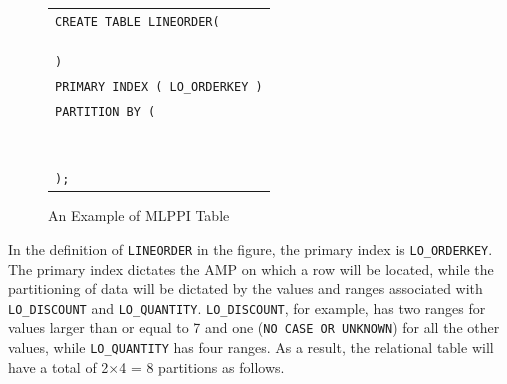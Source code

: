 \documentclass[paper]{ieice}
\begin{document}
\begin{figure}[htp!]
\begin{center}
{\small
\begin{tabular}{l}
{\tt CREATE TABLE LINEORDER(} \\
\hspace{0.1in}{\tt LO\_ORDERKEY INTEGER,} \\
\hspace{0.1in}{\tt LO\_QUANTITY INTEGER,} \\
\hspace{0.1in}{\tt LO\_DISCOUNT INTEGER} \\
{\tt )} \\
{\tt PRIMARY INDEX ( LO\_ORDERKEY )} \\
{\tt PARTITION BY (} \\
\hspace{0.1in}{\tt CASE\_N(} \\
\hspace{0.2in}{\tt LO\_DISCOUNT >= 7,} \\
\hspace{0.2in}{\tt NO CASE OR UNKNOWN),} \\
\hspace{0.1in}{\tt CASE\_N(}\\
\hspace{0.2in}{\tt LO\_QUANTITY < 25,} \\
\hspace{0.2in}{\tt LO\_QUANTITY >= 25 AND LO\_QUANTITY <= 30,} \\
\hspace{0.2in}{\tt LO\_QUANTITY > 30 AND LO\_QUANTITY <= 35,} \\
\hspace{0.2in}{\tt NO CASE OR UNKNOWN)} \\
{\tt );} \\
\end{tabular}
}
\end{center}
\caption{An Example of MLPPI Table\label{fig:exam}}
\end{figure}

\vspace{-.15in}

In the definition of {\tt LINEORDER} in the figure, the primary index 
is {\tt LO\_ORDERKEY}. 
The \hbox{primary} index \hbox{dictates} the AMP on which a row will be located, 
while the partitioning of data will be dictated by the values and 
ranges associated with {\tt LO\_DISCOUNT} and {\tt LO\_QUANTITY}. 
{\tt LO\_DISCOUNT}, for example, has two ranges for \hbox{values} 
larger than or equal to 7 and one ({\tt NO CASE OR UNKNOWN}) 
for all the other values, while {\tt LO\_QUANTITY} has four ranges. 
As a result, the relational table will have a total of 2$\times$4 = 8 partitions as follows.
\end{document}
